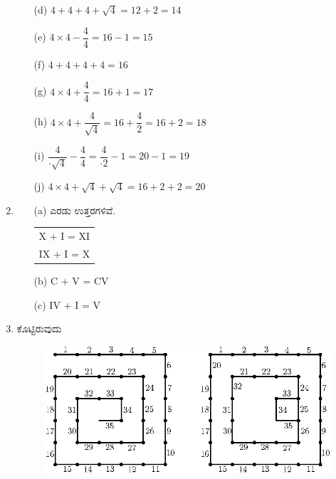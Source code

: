 \begin{enumerate}
\begin{itemize}
\smallskip

\item[(d)] $4 + 4 + 4 + \sqrt{4} = 12 + 2 = 14$

\smallskip

\item[(e)] $4\times 4 - \dfrac{4}{4} = 16 - 1 = 15$

\smallskip

\item[(f)] $4+4+4+4 = 16$

\smallskip

\item[(g)] $4\times 4 + \dfrac{4}{4} = 16 + 1 = 17$

\smallskip

\item[(h)] $4\times 4 + \dfrac{4}{\sqrt{4}} = 16 + \dfrac{4}{2} = 16 + 2 = 18$

\smallskip

\item[(i)] $\dfrac{4}{\cdot\sqrt{4}} - \dfrac{4}{4} = \dfrac{4}{\cdot 2} - 1 = 20 - 1 = 19$

\smallskip

\item[(j)] $4\times 4 + \sqrt{4} + \sqrt{4} = 16 + 2 + 2 = 20$
\end{itemize}

\item 
\begin{itemize}
\item[(a)] ಎರಡು ಉತ್ತರಗಳಿವೆ. 
\begin{tabular}[t]{l}
X + I = XI\\
IX + I = X
\end{tabular}
\item[(b)] C $+$ V = CV
\item[(c)] IV $+$ I = V 
\end{itemize}

\item ಕೊಟ್ಟಿರುವುದು 

\begin{figure}[H]
\centering
\includegraphics{images/chap12/ans8.eps}


\end{figure}
\end{enumerate}
